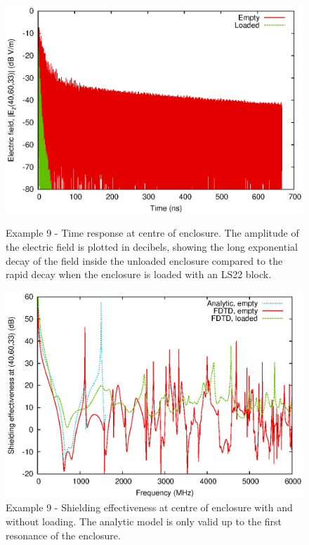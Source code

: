 \documentclass[onecolumn,a4paper]{article}
\numberwithin{equation}{section}
\begin{document}
\begin{figure}[ht!]
 \centerline{\includegraphics[width=12cm]{figures/enclosure_se_tdlog}}
 \caption{\label{fg:enclosure_se_td} Example 9 - Time response at centre of enclosure. The amplitude of the electric 
 field is plotted in decibels, showing the long exponential decay of the field inside the unloaded enclosure compared to
 the rapid decay when the enclosure is loaded with an LS22 block.}
 \centerline{\includegraphics[width=12cm]{figures/enclosure_se_fd}}
 \caption{\label{fg:enclosure_se_fd} Example 9 - Shielding effectiveness at centre of enclosure with and without loading. The analytic model
 is only valid up to the first resonance of the enclosure.}
\end{figure}
\end{document}
